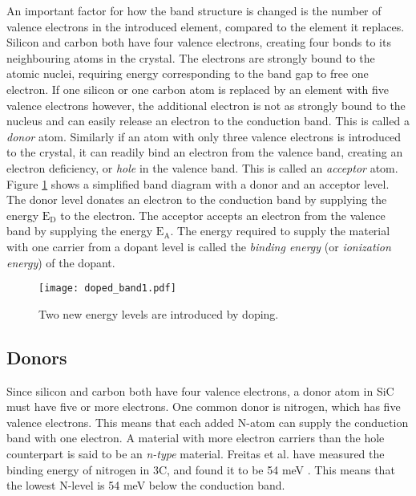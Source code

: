 An important factor for how the band structure is changed is the number of valence electrons in the introduced element, compared to the element it replaces. Silicon and carbon both have four valence electrons, creating four bonds to its neighbouring atoms in the crystal. The electrons are strongly bound to the atomic nuclei, requiring energy corresponding to the band gap to free one electron. If one silicon or one carbon atom is replaced by an element with five valence electrons however, the additional electron is not as strongly bound to the nucleus and can easily release an electron to the conduction band. This is called a \emph{donor} atom. Similarly if an atom with only three valence electrons is introduced to the crystal, it can readily bind an electron from the valence band, creating an electron deficiency, or \emph{hole} in the valence band. This is called an \emph{acceptor} atom. Figure \ref{fig:dopant_band} shows a simplified band diagram with a donor and an acceptor level. The donor level donates an electron to the conduction band by supplying the energy $\mathrm{E_D}$ to the electron. The acceptor accepts an electron from the valence band by supplying the energy $\mathrm{E_A}$. The energy required to supply the material with one carrier from a dopant level is called the \emph{binding energy} (or \emph{ionization energy}) of the dopant. 

\begin{figure}[h]
\begin{center}
\texttt{[image: doped\_band1.pdf]}
\caption{Two new energy levels are introduced by doping. 
\label{fig:dopant_band}}
\end{center}
\end{figure}

\subsection{Donors}
Since silicon and carbon both have four valence electrons, a donor atom in SiC must have five or more electrons. One common donor is nitrogen, which has five valence electrons. This means that each added N-atom can supply the conduction band with one electron. A material with more electron carriers than the hole counterpart is said to be an \emph{n-type} material. Freitas et al. have measured the binding energy of nitrogen in 3C, and found it to be 54 meV \cite{Freitas1988}. This means that the lowest N-level is 54 meV below the conduction band. 

